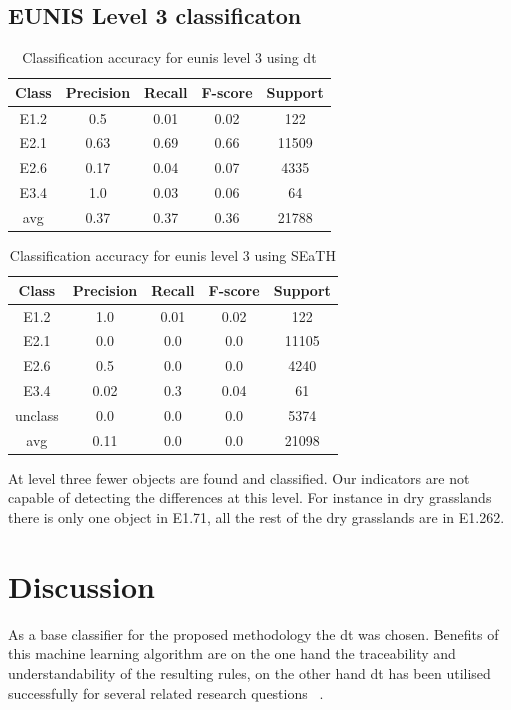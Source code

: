 \documentclass[authoryear,review,12pt,number]{elsarticle}
\begin{document}
\subsection{EUNIS Level 3 classificaton}
\begin{table}
\centering
\begin{tabular}{c c c c c}
Class & Precision & Recall & F-score & Support\\
\hline
E1.2 & 0.5 & 0.01 & 0.02 & 122\\
E2.1 & 0.63 & 0.69 & 0.66 & 11509\\
E2.6 & 0.17 & 0.04 & 0.07 & 4335\\
E3.4 & 1.0 & 0.03 & 0.06 & 64\\
avg & 0.37 & 0.37 & 0.36 & 21788\\
\end{tabular}
\caption{Classification accuracy for \gls{eunis} level 3 using \gls{dt}}
\end{table}
\begin{table}
\centering
\begin{tabular}{c c c c c}
Class & Precision & Recall & F-score & Support\\
\hline
E1.2 & 1.0 & 0.01 & 0.02 & 122\\
E2.1 & 0.0 & 0.0 & 0.0 & 11105\\
E2.6 & 0.5 & 0.0 & 0.0 & 4240\\
E3.4 & 0.02 & 0.3 & 0.04 & 61\\
unclass & 0.0 & 0.0 & 0.0 & 5374\\
avg & 0.11 & 0.0 & 0.0 & 21098\\
\end{tabular}
\caption{Classification accuracy for \gls{eunis} level 3 using SEaTH}
\end{table}
At level three fewer objects are found and classified. Our indicators are not 
capable of detecting the differences at this level. For instance in dry 
grasslands there is only one object in E1.71, all the rest of the dry 
grasslands are in E1.262.

\section{Discussion}
As a base classifier for the proposed methodology the \gls{dt} was chosen.
Benefits of this machine learning algorithm are on the one hand the traceability
and understandability of the resulting rules, on the other hand \gls{dt} has
been utilised successfully for several related research questions 
~\citep{Franke2012125, Otukei2010S27}.
\end{document}

